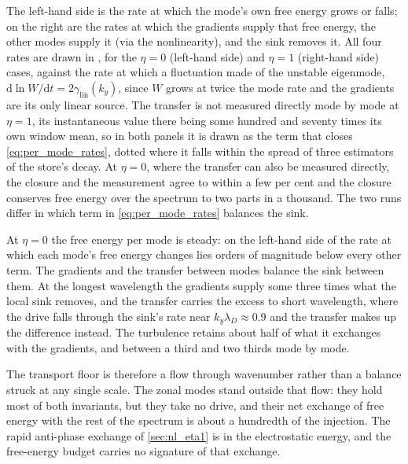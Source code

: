 \documentclass{jpp}
\newcommand{\rmd}{\text{d}}
\newcommand{\lambdaD}{\lambda_D}
\begin{document}
{\color{red}The left-hand side is the rate at which the mode's own free energy grows or falls; on the right are the rates at which the gradients supply that free energy, the other modes supply it (via the nonlinearity), and the sink removes it. All four rates are drawn in , for the $\eta=0$ (left-hand side) and $\eta=1$ (right-hand side) cases, against the rate at which a fluctuation made of the unstable eigenmode, $\rmd \ln W/\rmd t = 2\gamma_\mathrm{lin}(k_y)$, since $W$ grows at twice the mode rate and the gradients are its only linear source. The transfer is not measured directly mode by mode at $\eta = 1$, its instantaneous value there being some hundred and seventy times its own window mean, so in both panels it is drawn as the term that closes \cref{eq:per_mode_rates}, dotted where it falls within the spread of three estimators of the store's decay. At $\eta = 0$, where the transfer can also be measured directly, the closure and the measurement agree to within a few per cent and the closure conserves free energy over the spectrum to two parts in a thousand. The two runs differ in which term in \cref{eq:per_mode_rates} balances the sink.


At $\eta = 0$ the free energy per mode is steady: on the left-hand side of  the rate at which each mode's free energy changes lies orders of magnitude below every other term. The gradients and the transfer between modes balance the sink between them. At the longest wavelength the gradients supply some three times what the local sink removes, and the transfer carries the excess to short wavelength, where the drive falls through the sink's rate near $k_y\lambdaD \approx 0.9$ and the transfer makes up the difference instead. The turbulence retains about half of what it exchanges with the gradients, and between a third and two thirds mode by mode.} The transport floor is therefore a flow through wavenumber rather than a balance struck at any single scale. The zonal modes stand outside that flow: they hold most of both invariants, but they take no drive, and their net exchange of free energy with the rest of the spectrum is about a hundredth of the injection. The rapid anti-phase exchange of \cref{sec:nl_eta1} is in the electrostatic energy, and the free-energy budget carries no signature of that exchange.
\end{document}
